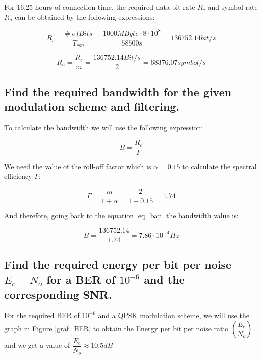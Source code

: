 \documentclass[a4paper,12pt,calibri,oneside,openany]{book}
\theoremstyle{break}
\begin{document}
		For 16.25 hours of connection time, the required data bit rate $R_{c}$ and symbol rate $R_{a}$ can be obtained by the following expressions:
		
		\begin{equation} \label{eq_rc}
			R_{c}= \dfrac{\# \ of Bits}{T_{con}} = \dfrac{1000 \unit{MByte} \cdot 8 \cdot 10^{8}}{58500 \unit{s}}= 136752.14 \unit{bit/s} 
		\end{equation}
	
		\begin{equation} \label{eq_ra}
			R_{a}= \dfrac{R_{c}}{m} = \dfrac{136752.14 \unit{Bit/s}}{2}= 68376.07 \unit{symbol/s} 
		\end{equation}
	
	\subsection{Find the required bandwidth for the given modulation scheme and filtering.}	
	
		To calculate the bandwidth we will use the following expression:
		
		\begin{equation} \label{eq_ban}
			B= \dfrac{R_{c}}{\Gamma} 
		\end{equation}
	
		We need the value of the roll-off factor which is $\alpha=0.15$ to calculate the spectral efficiency $\Gamma$:
		
		\begin{equation} \label{eq_espectral_eff}
			\Gamma= \dfrac{m}{1+\alpha} = \dfrac{2}{1+0.15} =  1.74
		\end{equation}
		
		And therefore, going back to the equation \ref{eq_ban} the bandwidth value is:
		
		\begin{equation} \label{eq_ban2}
			B= \dfrac{136752.14}{1.74} = 7.86 \cdot 10^{-4} \unit{Hz}
		\end{equation}
	
	\subsection{Find the required energy per bit per noise $E_{c}=N_{o}$ for a BER of $10^{-6}$ and the corresponding SNR.}
	
		For the required BER of $10^{-6}$ and a QPSK modulation scheme, we will use the graph in Figure \ref{graf_BER} to obtain the Energy per bit per noise ratio $\left(\dfrac{E_{c}}{N_{o}}\right)$ and we get a value of $\dfrac{E_{c}}{N_{o}}\approx10.5 \unit{dB}$
	
\end{document}
